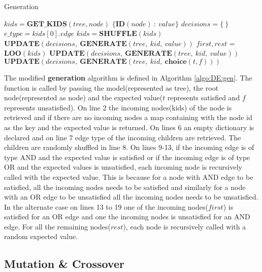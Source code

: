 \begin{algorithm}[!hbtp]
\caption{Generation}
\label{algo:DE:gen}
\begin{algorithmic}[1]
        \State $kids = \bm{GET\_KIDS}(tree, node)$
            \State \Return $\{\bm{ID}(node)\ :\ value\}$
        \EndIf
        \State $decisions = \{ \ \}$
        \State $e\_type = kids[0].edge$
        \State $kids = \bm{SHUFFLE}(kids)$
                \State $\bm{UPDATE}(decisions,\ \bm{GENERATE}(tree,\ kid,\ value))$
            \EndFor
        \Else
            \State $first, rest$ = $\bm{LOO}(kids)$
            \State $\bm{UPDATE}(decisions,\ \bm{GENERATE}(tree,\ kid,\ value))$
                \State $\bm{UPDATE}(decisions,\ \bm{GENERATE}(tree,\ kid,\ \bm{choice}(t, f)))$
            \EndFor
        \EndIf
    \EndProcedure
\end{algorithmic}
\end{algorithm}

The modified \textbf{generation} algorithm is defined in Algorithm \ref{algo:DE:gen}. The function is called by passing the model(represented as tree), the root node(represented as node) and the expected value($t$ represents satisfied and $f$ represents unsatisfied). On line 2 the incoming nodes(kids) of the node is retrieved and if there are no incoming nodes a map containing with the node id as the key and the expected value is returned. On lines 6 an empty dictionary is declared and on line 7 edge type of the incoming children are retrieved. The children are randomly shuffled in line 8. On lines 9-13, if the incoming edge is of type AND and the expected value is satisfied or if the incoming edge is of type OR and the expected values is unsatisfied, each incoming node is recursively called with the expected value. This is because for a node with AND edge to be satisfied, all the incoming nodes needs to be satisfied and similarly for a node with an OR edge to be unsatisfied all the incoming nodes needs to be unsatisfied. In the alternate case on lines 13 to 19 one of the incoming nodes($first$) is satisfied for an OR edge and one the incoming nodes is unsatisfied for an AND edge. For all the remaining nodes($rest$), each node is recursively called with a random expected value.

\subsection{Mutation \& Crossover}
\label{subsec:sa:de:mut}

